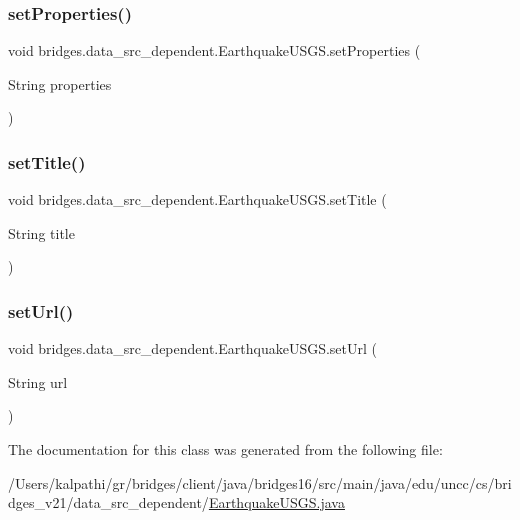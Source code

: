 \subsubsection{\texorpdfstring{set\+Properties()}{setProperties()}}
{\footnotesize\ttfamily void bridges.\+data\+\_\+src\+\_\+dependent.\+Earthquake\+U\+S\+G\+S.\+set\+Properties (\begin{DoxyParamCaption}\item[{String}]{properties }\end{DoxyParamCaption})}

\hypertarget{classbridges_1_1data__src__dependent_1_1_earthquake_u_s_g_s_a0432f641e0089fc004c441b7239ad6a0}{}\label{classbridges_1_1data__src__dependent_1_1_earthquake_u_s_g_s_a0432f641e0089fc004c441b7239ad6a0} 
\subsubsection{\texorpdfstring{set\+Title()}{setTitle()}}
{\footnotesize\ttfamily void bridges.\+data\+\_\+src\+\_\+dependent.\+Earthquake\+U\+S\+G\+S.\+set\+Title (\begin{DoxyParamCaption}\item[{String}]{title }\end{DoxyParamCaption})}

\hypertarget{classbridges_1_1data__src__dependent_1_1_earthquake_u_s_g_s_aaa9d26333e7b80d0f72da58ea2ad41d1}{}\label{classbridges_1_1data__src__dependent_1_1_earthquake_u_s_g_s_aaa9d26333e7b80d0f72da58ea2ad41d1} 
\subsubsection{\texorpdfstring{set\+Url()}{setUrl()}}
{\footnotesize\ttfamily void bridges.\+data\+\_\+src\+\_\+dependent.\+Earthquake\+U\+S\+G\+S.\+set\+Url (\begin{DoxyParamCaption}\item[{String}]{url }\end{DoxyParamCaption})}



The documentation for this class was generated from the following file\+:\begin{DoxyCompactItemize}
\item 
/\+Users/kalpathi/gr/bridges/client/java/bridges16/src/main/java/edu/uncc/cs/bridges\+\_\+v21/data\+\_\+src\+\_\+dependent/\hyperlink{_earthquake_u_s_g_s_8java}{Earthquake\+U\+S\+G\+S.\+java}\end{DoxyCompactItemize}
